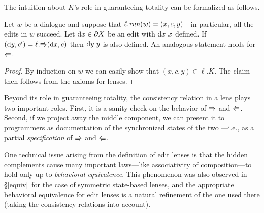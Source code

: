 The intuition about $K$'s role in guaranteeing totality can be formalized as
follows.


\begin{theorem}\label{nofail}
Let $w$ be a dialogue and suppose that $\ell.\mathit{run}(w)=(x,c,y)$---in
particular, all the edits in $w$ succeed.
Let $\textrm{d} x\in\partial X$ be an edit with $\textrm{d} x\ x$ defined. If
$(\textrm{d} y,c')=\ell.\mathord{\Rrightarrow}(\textrm{d} x,c)$ then $\textrm{d} y\ y$ is also defined. An analogous
statement holds for $\mathord{\Lleftarrow}$.
\end{theorem}

\iffull
\begin{proof}
By induction on $w$ we can easily show that $(x,c,y)\in \ell.K$. The claim
then follows from the axioms for lenses.
\end{proof}
\fi

\iflater {}  \fi

Beyond its role in guaranteeing totality, the consistency relation in a lens
plays two important roles.  First, it is a sanity check on the behavior of
$\mathord{\Rrightarrow}$ and $\mathord{\Lleftarrow}$.  Second, if we project away the middle component, we
can present it to programmers as documentation of the synchronized states of
the two \replicas---i.e., as a partial {\em specification} of $\mathord{\Rrightarrow}$ and
$\mathord{\Lleftarrow}$.

One technical issue arising from the definition of edit lenses is that the
hidden complements cause many important laws---like associativity of
composition---to hold only up to {\em behavioral equivalence}.  This phenomenon
was also observed in \ifdissertation\S\ref{equiv}\else\cite[\S
3]{HofmannPierceWagner10}\fi\ for the case of
symmetric state-based lenses, and the appropriate behavioral equivalence
for edit lenses is a natural refinement of the one used there (taking the
consistency relations into account).

